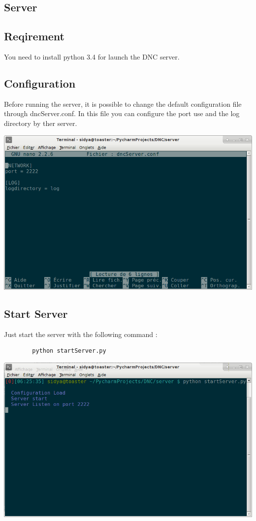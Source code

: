 \documentclass[12pt]{article}
\begin{document}
\clearpage
\tableofcontents
\clearpage
\begin{flushleft}
\section{Server}
    \subsection{Reqirement}
    You need to install python 3.4 for launch the DNC server.
    
	\subsection{Configuration}
	Before running the server, it is possible to change the default configuration file through dncServer.conf. In this file you can configure the port use and the log directory by ther server.
	
	\begin{center}
		\includegraphics[scale=0.5]{config.png}
	\end{center}
	\newpage
	\subsection{Start Server}
	Just start the server with the following command :
	\begin{lstlisting}
 		python startServer.py

 	\end{lstlisting} 
 	\begin{center}
 		\includegraphics[scale=0.5]{start.png}
 	\end{center}
 	
 	
  

		
\end{flushleft}
\end{document}
